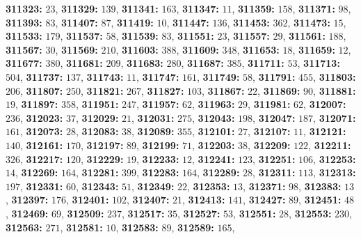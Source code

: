 \textsf{\bfseries 311323:} $23$, \textsf{\bfseries 311329:} $139$, \textsf{\bfseries 311341:} $163$, \textsf{\bfseries 311347:} $11$, \textsf{\bfseries 311359:} $158$, \textsf{\bfseries 311371:} $98$, \textsf{\bfseries 311393:} $83$, \textsf{\bfseries 311407:} $87$, \textsf{\bfseries 311419:} $10$, \textsf{\bfseries 311447:} $136$, \textsf{\bfseries 311453:} $362$, \textsf{\bfseries 311473:} $15$, \textsf{\bfseries 311533:} $179$, \textsf{\bfseries 311537:} $58$, \textsf{\bfseries 311539:} $83$, \textsf{\bfseries 311551:} $23$, \textsf{\bfseries 311557:} $29$, \textsf{\bfseries 311561:} $188$, \textsf{\bfseries 311567:} $30$, \textsf{\bfseries 311569:} $210$, \textsf{\bfseries 311603:} $388$, \textsf{\bfseries 311609:} $348$, \textsf{\bfseries 311653:} $18$, \textsf{\bfseries 311659:} $12$, \textsf{\bfseries 311677:} $380$, \textsf{\bfseries 311681:} $209$, \textsf{\bfseries 311683:} $280$, \textsf{\bfseries 311687:} $385$, \textsf{\bfseries 311711:} $53$, \textsf{\bfseries 311713:} $504$, \textsf{\bfseries 311737:} $137$, \textsf{\bfseries 311743:} $11$, \textsf{\bfseries 311747:} $161$, \textsf{\bfseries 311749:} $58$, \textsf{\bfseries 311791:} $455$, \textsf{\bfseries 311803:} $206$, \textsf{\bfseries 311807:} $250$, \textsf{\bfseries 311821:} $267$, \textsf{\bfseries 311827:} $103$, \textsf{\bfseries 311867:} $22$, \textsf{\bfseries 311869:} $90$, \textsf{\bfseries 311881:} $19$, \textsf{\bfseries 311897:} $358$, \textsf{\bfseries 311951:} $247$, \textsf{\bfseries 311957:} $62$, \textsf{\bfseries 311963:} $29$, \textsf{\bfseries 311981:} $62$, \textsf{\bfseries 312007:} $236$, \textsf{\bfseries 312023:} $37$, \textsf{\bfseries 312029:} $21$, \textsf{\bfseries 312031:} $275$, \textsf{\bfseries 312043:} $198$, \textsf{\bfseries 312047:} $187$, \textsf{\bfseries 312071:} $161$, \textsf{\bfseries 312073:} $28$, \textsf{\bfseries 312083:} $38$, \textsf{\bfseries 312089:} $355$, \textsf{\bfseries 312101:} $27$, \textsf{\bfseries 312107:} $11$, \textsf{\bfseries 312121:} $140$, \textsf{\bfseries 312161:} $170$, \textsf{\bfseries 312197:} $89$, \textsf{\bfseries 312199:} $71$, \textsf{\bfseries 312203:} $38$, \textsf{\bfseries 312209:} $122$, \textsf{\bfseries 312211:} $326$, \textsf{\bfseries 312217:} $120$, \textsf{\bfseries 312229:} $19$, \textsf{\bfseries 312233:} $12$, \textsf{\bfseries 312241:} $123$, \textsf{\bfseries 312251:} $106$, \textsf{\bfseries 312253:} $14$, \textsf{\bfseries 312269:} $164$, \textsf{\bfseries 312281:} $399$, \textsf{\bfseries 312283:} $164$, \textsf{\bfseries 312289:} $28$, \textsf{\bfseries 312311:} $113$, \textsf{\bfseries 312313:} $197$, \textsf{\bfseries 312331:} $60$, \textsf{\bfseries 312343:} $51$, \textsf{\bfseries 312349:} $22$, \textsf{\bfseries 312353:} $13$, \textsf{\bfseries 312371:} $98$, \textsf{\bfseries 312383:} $13$, \textsf{\bfseries 312397:} $176$, \textsf{\bfseries 312401:} $102$, \textsf{\bfseries 312407:} $21$, \textsf{\bfseries 312413:} $141$, \textsf{\bfseries 312427:} $89$, \textsf{\bfseries 312451:} $48$, \textsf{\bfseries 312469:} $69$, \textsf{\bfseries 312509:} $237$, \textsf{\bfseries 312517:} $35$, \textsf{\bfseries 312527:} $53$, \textsf{\bfseries 312551:} $28$, \textsf{\bfseries 312553:} $230$, \textsf{\bfseries 312563:} $271$, \textsf{\bfseries 312581:} $10$, \textsf{\bfseries 312583:} $89$, \textsf{\bfseries 312589:} $165$, 
